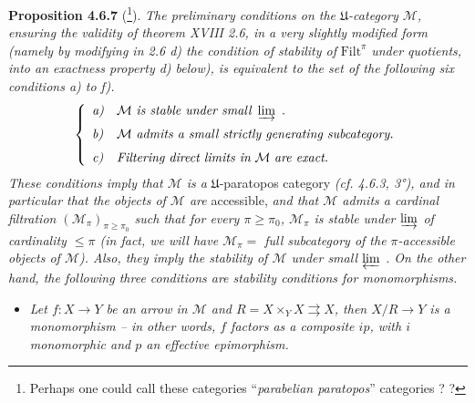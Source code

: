 \documentclass[11pt]{article}
\newcommand{\msp}[1]{\marginpar{\footnotesize [#1]}}
\newcommand{\Mc}{\mathcal{M}}
\newcommand{\U}{\mathfrak{U}}
\begin{document}
\textbf{Proposition 4.6.7} (\footnote[62]{Perhaps one could call these categories ``\textit{parabelian paratopos}'' categories ? ?}). \textit{The preliminary conditions on the $\U$-category $\Mc$, ensuring the validity of theorem XVIII 2.6, in a very slightly modified form (namely by modifying in 2.6 d) the condition of stability of} $\mathrm{Filt}^{\pi}$ \textit{under quotients, into an exactness property d) below), is equivalent to the set of the following six conditions a) to f).} %
\[
\left\{
\begin{array}{ll}
\textit{a)} & \Mc\ \textit{is stable under small}\ \varinjlim\ . \\[1.5ex]
\textit{b)} & \Mc\ \textit{admits a small strictly generating subcategory.} \\[1.5ex]
\textit{c)} & \textit{Filtering direct limits in}\ \Mc\ \textit{are exact.}
\end{array}
\right.
\]
\textit{These conditions imply that $\Mc$ is a} $\U$-paratopos category \textit{(cf. 4.6.3, 3°), and in particular that the objects of $\Mc$ are} accessible, \textit{and that $\Mc$ admits a cardinal filtration $(\Mc_{\pi})_{\pi \geqslant \pi_0}$ such that for every $\pi \geqslant \pi_0$, $\Mc_{\pi}$ is stable under $\varinjlim$ of cardinality $\leqslant \pi$ (in fact, we will have $\Mc_{\pi} =$ full subcategory of the $\pi$-accessible objects of $\Mc$). Also, they imply the stability of $\Mc$ under small $\varprojlim$ . On the other hand, the following three conditions are stability conditions for monomorphisms.}
\begin{itemize}[leftmargin=4em]
\item[\textit{d)}] \textit{Let $f : X \longrightarrow Y$ be an arrow in $\Mc$ and $R = X \times_Y X \rightrightarrows X$, then $X/R \longrightarrow Y$ is a monomorphism -- in other words, $f$ factors as a composite $ip$, with $i$ monomorphic and $p$ an effective epimorphism.}
\end{itemize}

\msp{page 158}
\end{document}
